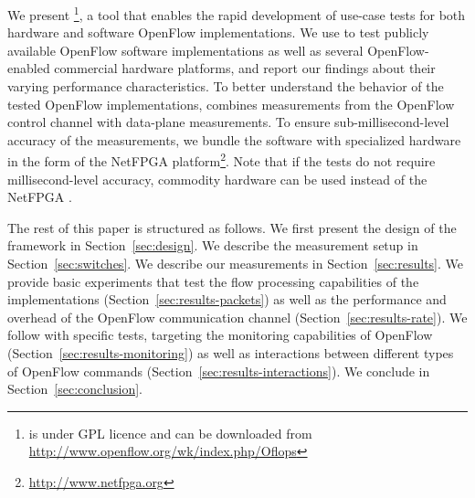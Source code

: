 We present \oflops\footnote{\oflops is under GPL licence and can be downloaded 
from \url{http://www.openflow.org/wk/index.php/Oflops}}, 
a tool that enables the rapid development of
use-case tests for both hardware and software OpenFlow
implementations. We use \oflops to test publicly available OpenFlow
software implementations as well as several OpenFlow-enabled
commercial hardware platforms, and report our findings about their
varying performance characteristics. To better understand the behavior
of the tested OpenFlow implementations, \oflops combines measurements
from the OpenFlow control channel with data-plane measurements. To
ensure sub-millisecond-level accuracy of the measurements, we bundle the
\oflops software with specialized hardware in the form of the NetFPGA
platform\footnote{\url{http://www.netfpga.org}}.  Note that if the
tests do not require millisecond-level accuracy, commodity hardware
can be used instead of the NetFPGA \cite{pam-accuracy}.




The rest of this paper is structured as follows. We first present the design
of the \oflops framework in Section~\ref{sec:design}. We describe the 
measurement setup in Section~\ref{sec:switches}. We describe our measurements
in Section~\ref{sec:results}. We provide basic experiments that test the flow
processing capabilities of the implementations (Section~\ref{sec:results-packets})
as well as the performance and overhead of the OpenFlow communication channel 
(Section~\ref{sec:results-rate}). We follow with specific tests, targeting the monitoring
capabilities of OpenFlow (Section~\ref{sec:results-monitoring}) as well as interactions
between different types of OpenFlow commands (Section~\ref{sec:results-interactions}).
We conclude in Section~\ref{sec:conclusion}.

